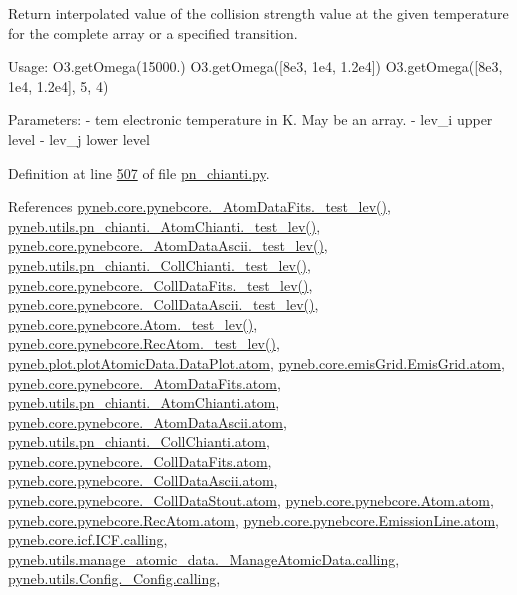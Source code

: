 \begin{DoxyVerb}Return interpolated value of the collision strength value at the given temperature 
    for the complete array or a specified transition.

Usage:
    O3.getOmega(15000.)
    O3.getOmega([8e3, 1e4, 1.2e4])
    O3.getOmega([8e3, 1e4, 1.2e4], 5, 4)

Parameters:
    - tem    electronic temperature in K. May be an array.
    - lev_i  upper level
    - lev_j  lower level\end{DoxyVerb}
 

Definition at line \hyperlink{pn__chianti_8py_source_l00507}{507} of file \hyperlink{pn__chianti_8py_source}{pn\-\_\-chianti.\-py}.



References \hyperlink{pynebcore_8py_source_l00178}{pyneb.\-core.\-pynebcore.\-\_\-\-Atom\-Data\-Fits.\-\_\-test\-\_\-lev()}, \hyperlink{pn__chianti_8py_source_l00304}{pyneb.\-utils.\-pn\-\_\-chianti.\-\_\-\-Atom\-Chianti.\-\_\-test\-\_\-lev()}, \hyperlink{pynebcore_8py_source_l00447}{pyneb.\-core.\-pynebcore.\-\_\-\-Atom\-Data\-Ascii.\-\_\-test\-\_\-lev()}, \hyperlink{pn__chianti_8py_source_l00472}{pyneb.\-utils.\-pn\-\_\-chianti.\-\_\-\-Coll\-Chianti.\-\_\-test\-\_\-lev()}, \hyperlink{pynebcore_8py_source_l00677}{pyneb.\-core.\-pynebcore.\-\_\-\-Coll\-Data\-Fits.\-\_\-test\-\_\-lev()}, \hyperlink{pynebcore_8py_source_l01045}{pyneb.\-core.\-pynebcore.\-\_\-\-Coll\-Data\-Ascii.\-\_\-test\-\_\-lev()}, \hyperlink{pynebcore_8py_source_l01525}{pyneb.\-core.\-pynebcore.\-Atom.\-\_\-test\-\_\-lev()}, \hyperlink{pynebcore_8py_source_l02672}{pyneb.\-core.\-pynebcore.\-Rec\-Atom.\-\_\-test\-\_\-lev()}, \hyperlink{plot_atomic_data_8py_source_l00044}{pyneb.\-plot.\-plot\-Atomic\-Data.\-Data\-Plot.\-atom}, \hyperlink{emis_grid_8py_source_l00051}{pyneb.\-core.\-emis\-Grid.\-Emis\-Grid.\-atom}, \hyperlink{pynebcore_8py_source_l00089}{pyneb.\-core.\-pynebcore.\-\_\-\-Atom\-Data\-Fits.\-atom}, \hyperlink{pn__chianti_8py_source_l00231}{pyneb.\-utils.\-pn\-\_\-chianti.\-\_\-\-Atom\-Chianti.\-atom}, \hyperlink{pynebcore_8py_source_l00310}{pyneb.\-core.\-pynebcore.\-\_\-\-Atom\-Data\-Ascii.\-atom}, \hyperlink{pn__chianti_8py_source_l00425}{pyneb.\-utils.\-pn\-\_\-chianti.\-\_\-\-Coll\-Chianti.\-atom}, \hyperlink{pynebcore_8py_source_l00576}{pyneb.\-core.\-pynebcore.\-\_\-\-Coll\-Data\-Fits.\-atom}, \hyperlink{pynebcore_8py_source_l00926}{pyneb.\-core.\-pynebcore.\-\_\-\-Coll\-Data\-Ascii.\-atom}, \hyperlink{pynebcore_8py_source_l01162}{pyneb.\-core.\-pynebcore.\-\_\-\-Coll\-Data\-Stout.\-atom}, \hyperlink{pynebcore_8py_source_l01218}{pyneb.\-core.\-pynebcore.\-Atom.\-atom}, \hyperlink{pynebcore_8py_source_l02635}{pyneb.\-core.\-pynebcore.\-Rec\-Atom.\-atom}, \hyperlink{pynebcore_8py_source_l03391}{pyneb.\-core.\-pynebcore.\-Emission\-Line.\-atom}, \hyperlink{icf_8py_source_l00016}{pyneb.\-core.\-icf.\-I\-C\-F.\-calling}, \hyperlink{manage__atomic__data_8py_source_l00018}{pyneb.\-utils.\-manage\-\_\-atomic\-\_\-data.\-\_\-\-Manage\-Atomic\-Data.\-calling}, \hyperlink{_config_8py_source_l00032}{pyneb.\-utils.\-Config.\-\_\-\-Config.\-calling}, 
